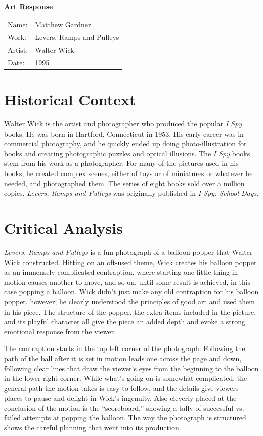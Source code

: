 \documentclass[onecolumn, 12pt]{article}
\title{}
\author{Matthew Gardner}
\date{}
\begin{document}
\textbf{Art Response}

\begin{tabular}{ll}
  Name:&Matthew Gardner \\
  Work:&Levers, Ramps and Pulleys \\
  Artist:&Walter Wick \\
  Date:&1995 \\
\end{tabular}

\section*{Historical Context}

Walter Wick is the artist and photographer who produced the popular \emph{I
Spy} books.  He was born in Hartford, Connecticut in 1953.  His early career
was in commercial photography, and he quickly ended up doing photo-illustration
for books and creating photographic puzzles and optical illusions.  The \emph{I
Spy} books stem from his work as a photographer.  For many of the pictures used
in his books, he created complex scenes, either of toys or of miniatures or
whatever he needed, and photographed them.  The series of eight books sold over
a million copies.  \emph{Levers, Ramps and Pulleys} was originally published in
\emph{I Spy: School Days}.

\section*{Critical Analysis}

\emph{Levers, Ramps and Pulleys} is a fun photograph of a balloon popper that
Walter Wick constructed.  Hitting on an oft-used theme, Wick creates his
balloon popper as an immensely complicated contraption, where starting one
little thing in motion causes another to move, and so on, until some result is
achieved, in this case popping a balloon.  Wick didn't just make any old
contraption for his balloon popper, however; he clearly understood the
principles of good art and used them in his piece.  The structure of the
popper, the extra items included in the picture, and its playful character all
give the piece an added depth and evoke a strong emotional response from the
viewer.

The contraption starts in the top left corner of the photograph.  Following the
path of the ball after it is set in motion leads one across the page and down,
following clear lines that draw the viewer's eyes from the beginning to the
balloon in the lower right corner.  While what's going on is somewhat
complicated, the general path the motion takes is easy to follow, and the
details give viewers places to pause and delight in Wick's ingenuity.  Also
cleverly placed at the conclusion of the motion is the ``scoreboard,'' showing
a tally of successful vs. failed attempts at popping the balloon.  The way the
photograph is structured shows the careful planning that went into its
production.
\end{document}
